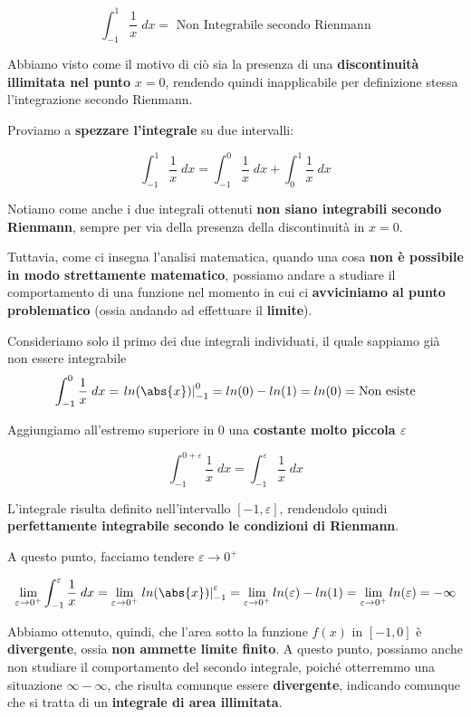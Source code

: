 \documentclass[a4paper, 12pt]{report}
\begin{document}
    \[ \int_{-1}^{1} \frac{1}{x} \; dx = \text{ Non Integrabile secondo Rienmann}\]
    
    Abbiamo visto come il motivo di ciò sia la presenza di una \textbf{discontinuità illimitata nel punto }$x = 0$, rendendo quindi inapplicabile per definizione stessa l'integrazione secondo Rienmann.
    
    Proviamo a \textbf{spezzare l'integrale} su due intervalli:
    
    \[ \int_{-1}^{1} \frac{1}{x} \; dx = \int_{-1}^{0} \frac{1}{x} \; dx + \int_{0}^{1} \frac{1}{x} \; dx\]
    
    Notiamo come anche i due integrali ottenuti \textbf{non siano integrabili secondo Rienmann}, sempre per via della presenza della discontinuità in $x = 0$.
    
    Tuttavia, come ci insegna l'analisi matematica, quando una cosa \textbf{non è possibile in modo strettamente matematico}, possiamo andare a studiare il comportamento di una funzione nel momento in cui ci \textbf{avviciniamo al punto problematico} (ossia andando ad effettuare il \textbf{limite}).
    
    Consideriamo solo il primo dei due integrali individuati, il quale sappiamo già non essere integrabile
    \[ \int_{-1}^{0} \frac{1}{x} \; dx = \left . ln(\abs{x}) \right |_{-1}^{0} = ln(0) - ln(1) = ln(0) = \text{Non esiste}\]
    
    Aggiungiamo all'estremo superiore in $0$ una \textbf{costante molto piccola $\varepsilon$}
    
    \[ \int_{-1}^{0+\varepsilon} \frac{1}{x} \; dx = \int_{-1}^{\varepsilon} \frac{1}{x} \; dx \]
    
    L'integrale risulta definito nell'intervallo $[-1, \varepsilon]$, rendendolo quindi \textbf{perfettamente integrabile secondo le condizioni di Rienmann}.
    
    A questo punto, facciamo tendere $\varepsilon \to 0^+$
    
    \[ \lim_{\varepsilon \to 0^+} \int_{-1}^{\varepsilon} \frac{1}{x} \; dx = \lim_{\varepsilon \to 0^+} \left . ln(\abs{x}) \right |_{-1}^{\varepsilon} = \lim_{\varepsilon \to 0^+} ln(\varepsilon) - ln(1) = \lim_{\varepsilon \to 0^+} ln(\varepsilon) = -\infty\]
    
    Abbiamo ottenuto, quindi, che l'area sotto la funzione $f(x)$ in $[-1, 0]$ è \textbf{divergente}, ossia \textbf{non ammette limite finito}. A questo punto, possiamo anche non studiare il comportamento del secondo integrale, poiché otterremmo una situazione $\infty - \infty$, che risulta comunque essere \textbf{divergente}, indicando comunque che si tratta di un \textbf{integrale di area illimitata}.
    
\end{document}
